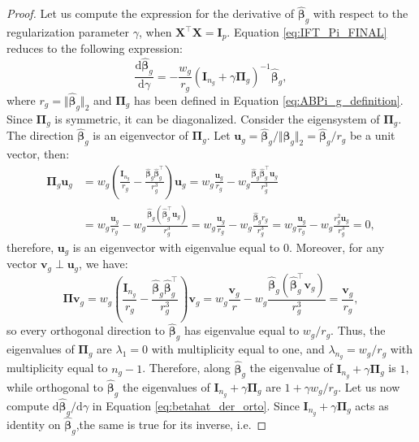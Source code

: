 \documentclass[a4paper, 12pt]{article}
\newcommand{\betahat}{\widehat{\boldsymbol\beta}}
\newcommand{\T}{\top}
\def\bPi{\boldsymbol{\Pi}}
\def\bu{\boldsymbol{u}}
\def\bv{\boldsymbol{v}}
\def\bI{\mathbf{I}}
\def\bX{\mathbf{X}}
\def\bu{\mathbf{u}}
\def\bv{\mathbf{v}}
\begin{document}
\begin{proof}
Let us compute the expression for the derivative of $\betahat_g$ with respect to the regularization parameter $\gamma$, when $\bX^{\T}\bX=\bI_p$. Equation \eqref{eq:IFT_Pi_FINAL} reduces to the following expression:
\begin{equation}
\label{eq:betahat_der_orto}
\frac{\mathrm{d}\betahat_g}{\mathrm{d}\gamma}
= -\frac{w_g}{r_g}( \bI_{n_g} + \gamma \bPi_g)^{-1} \betahat_g,
\end{equation}
where $r_g= \Vert\betahat_g\Vert_2$ and $\bPi_g$ has been defined in Equation \eqref{eq:ABPi_g_definition}.
Since $\boldsymbol{\Pi}_g$ is symmetric, it can be diagonalized. Consider the eigensystem of $\boldsymbol{\Pi}_g$. The direction $\betahat_g$ is an eigenvector of $\boldsymbol{\Pi}_g$. Let $\bu_g = \betahat_g / \Vert\betahat_g\Vert_2 = \betahat_g / r_g$ be a unit vector, then:
\begin{equation*}
\begin{aligned}
\boldsymbol{\Pi}_g \bu_g &= w_g\left( \frac{\bI_{n_g}}{r_g} - \frac{\betahat_g \betahat_g^{\T}}{r_g^3} \right) \bu_g
= w_g\frac{\bu_g}{r_g} - w_g\frac{\betahat_g \betahat_g^{\T} \bu_g}{r_g^3}\\
&= w_g\frac{\bu_g}{r_g} - w_g\frac{\betahat_g  (\betahat_g^{\T} \bu_g)}{r_g^3}
= w_g\frac{\bu_g}{r_g} - w_g\frac{\betahat_g  r_g}{r_g^3}
= w_g\frac{\bu_g}{r_g} - w_g\frac{r_g^2 \bu_g}{r_g^3} = 0,
\end{aligned}
\end{equation*}
therefore, $\bu_g$ is an eigenvector with eigenvalue equal to $0$. Moreover, for any vector $\bv_g \perp \bu_g$, we have:
\begin{equation*}
\boldsymbol{\Pi} \bv_g = w_g\left( \frac{\bI_{n_g}}{r_g} - \frac{\betahat_g \betahat_g^{\T}}{r_g^3} \right) \bv_g
= w_g\frac{\bv_g}{r} - w_g\frac{\betahat_g (\betahat_g^{\T} \bv_g)}{r_g^3}
= \frac{\bv_g}{r_g},  
\end{equation*}
so every orthogonal direction to $\betahat_g$ has eigenvalue equal to $w_g/r_g$. Thus, the eigenvalues of $\boldsymbol{\Pi}_g$ are $\lambda_1=0$ with multiplicity equal to one, and $\lambda_{n_g} = w_g/r_g$ with multiplicity equal to $n_g-1$. Therefore, along $\betahat_g$ the eigenvalue of $\bI_{n_g} + \gamma\boldsymbol{\Pi}_g$ is $1$, while orthogonal to $\betahat_g$ the eigenvalues of $\bI_{n_g} + \gamma\boldsymbol{\Pi}_g$ are $1 + \gamma w_g/r_g$. Let us now compute $\mathrm{d}\betahat_g/\mathrm{d}\gamma$ in Equation \eqref{eq:betahat_der_orto}. Since $\bI_{n_g} + \gamma \bPi_g$ acts as identity on $\betahat_g$,the same is true for its inverse, i.e. 

\end{proof}
\end{document}
